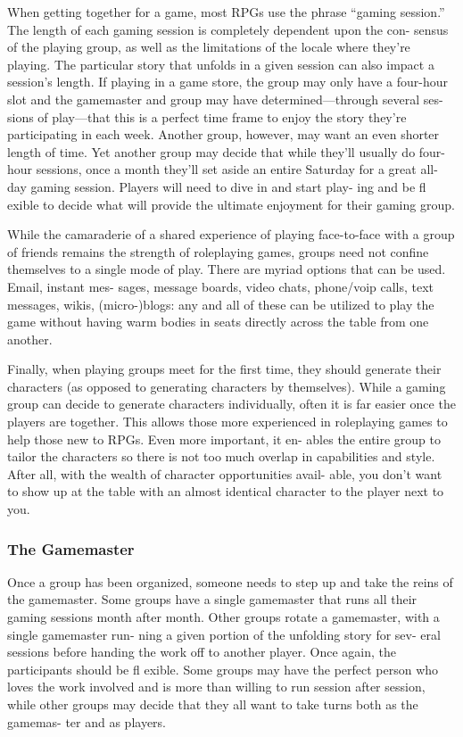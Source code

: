 When getting together for a game, most RPGs 
use the phrase ``gaming session.'' The length of each 
gaming session is completely dependent upon the con-
sensus of the playing group, as well as the limitations 
of the locale where they're playing. The particular 
story that unfolds in a given session can also impact a 
session's length. If playing in a game store, the group 
may only have a four-hour slot and the gamemaster 
and group may have determined—through several ses-
sions of play—that this is a perfect time frame to enjoy 
the story they're participating in each week. Another 
group, however, may want an even shorter length of 
time. Yet another group may decide that while they'll 
usually do four-hour sessions, once a month they'll 
set aside an entire Saturday for a great all-day gaming 
session. Players will need to dive in and start play-
ing and be fl exible to decide what will provide the 
ultimate enjoyment for their gaming group.

While the camaraderie of a shared experience of 
playing face-to-face with a group of friends remains 
the strength of roleplaying games, groups need not 
confine themselves to a single mode of play. There are 
myriad options that can be used. Email, instant mes-
sages, message boards, video chats, phone/voip calls, 
text messages, wikis, (micro-)blogs: any and all of 
these can be utilized to play the game without having 
warm bodies in seats directly across the table from 
one another.

Finally, when playing groups meet for the first time, 
they should generate their characters (as opposed to 
generating characters by themselves). While a gaming 
group can decide to generate characters individually, 
often it is far easier once the players are together. This 
allows those more experienced in roleplaying games to 
help those new to RPGs. Even more important, it en-
ables the entire group to tailor the characters so there 
is not too much overlap in capabilities and style. After 
all, with the wealth of character opportunities avail-
able, you don't want to show up at the table with an 
almost identical character to the player next to you.

\subsubsection{The Gamemaster}

Once a group has been organized, someone needs to 
step up and take the reins of the gamemaster. Some 
groups have a single gamemaster that runs all their 
gaming sessions month after month. Other groups 
rotate a gamemaster, with a single gamemaster run-
ning a given portion of the unfolding story for sev-
eral sessions before handing the work off to another 
player. Once again, the participants should be fl exible. 
Some groups may have the perfect person who loves 
the work involved and is more than willing to run 
session after session, while other groups may decide 
that they all want to take turns both as the gamemas-
ter and as players.

